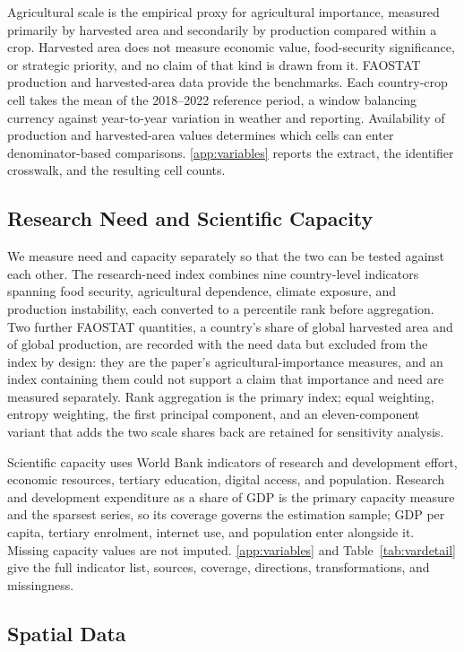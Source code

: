 \documentclass[ASNA,twocolumn]{USG}
\begin{document}
Agricultural scale is the empirical proxy for agricultural importance, measured primarily by
harvested area and secondarily by production compared within a crop. Harvested area does not
measure economic value, food-security significance, or strategic priority, and no claim of that
kind is drawn from it. FAOSTAT production and harvested-area data provide the benchmarks.
Each country-crop cell takes the mean of the 2018--2022 reference period, a window balancing
currency against year-to-year variation in weather and reporting. Availability of production
and harvested-area values determines which cells can enter denominator-based comparisons.
\ref{app:variables} reports the extract, the identifier crosswalk, and the resulting cell
counts.

\subsection{Research Need and Scientific Capacity}

We measure need and capacity separately so that the two can be tested against each other.
The research-need index combines nine country-level indicators spanning food security,
agricultural dependence, climate exposure, and production instability, each converted to a
percentile rank before aggregation. Two further FAOSTAT quantities, a country's share of
global harvested area and of global production, are recorded with the need data but excluded
from the index by design: they are the paper's agricultural-importance measures, and an index
containing them could not support a claim that importance and need are measured separately.
Rank aggregation is the primary index; equal weighting, entropy weighting, the first
principal component, and an eleven-component variant that adds the two scale shares back are
retained for sensitivity analysis.

Scientific capacity uses World Bank indicators of research and development effort, economic
resources, tertiary education, digital access, and population. Research and development
expenditure as a share of GDP is the primary capacity measure and the sparsest series, so its
coverage governs the estimation sample; GDP per capita, tertiary enrolment, internet use, and
population enter alongside it. Missing capacity values are not imputed.
\ref{app:variables} and Table~\ref{tab:vardetail} give the full indicator list, sources,
coverage, directions, transformations, and missingness.

\subsection{Spatial Data}
\end{document}
